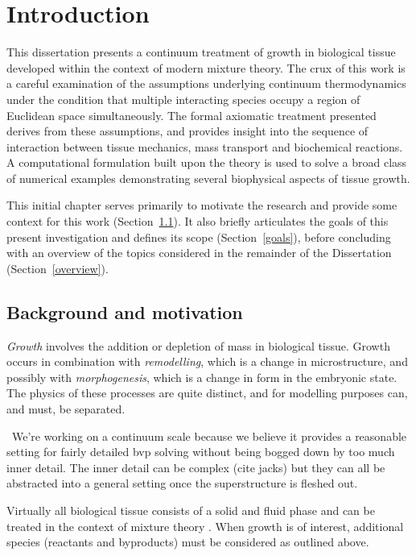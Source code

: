 \chapter{Introduction}
\label{introduction}

This dissertation presents a continuum treatment of growth in
biological tissue developed within the context of modern mixture
theory. The crux of this work is a careful examination of the
assumptions underlying continuum thermodynamics under the condition
that multiple interacting species occupy a region of Euclidean space
simultaneously. The formal axiomatic treatment presented derives from
these assumptions, and provides insight into the sequence of
interaction between tissue mechanics, mass transport and biochemical
reactions. A computational formulation built upon the theory is used
to solve a broad class of numerical examples demonstrating several
biophysical aspects of tissue growth.

This initial chapter serves primarily to motivate the research and
provide some context for this work (Section~\ref{background}). It also
briefly articulates the goals of this present investigation and
defines its scope (Section~\ref{goals}), before concluding with an
overview of the topics considered in the remainder of the Dissertation
(Section~\ref{overview}).

\citep{Narayananetal:07}

\section{Background and motivation}
\label{background}

\emph{Growth} involves the addition or depletion of mass in biological
tissue. Growth occurs in combination with
\emph{remodelling}, which is a change in microstructure, and possibly
with \emph{morphogenesis}, which is a change in form in the embryonic
state. The physics of these processes are quite distinct, and for
modelling purposes can, and must, be separated.

\textbullet\ We're working on a continuum scale because we believe it provides a
reasonable setting for fairly detailed bvp solving without being
bogged down by too much inner detail. The inner detail can be complex
(cite jacks) but they can all be abstracted into a general setting
once the superstructure is fleshed out.

Virtually all biological tissue consists of a solid and fluid
phase and can be treated in the context of mixture theory
\citep{TruesdellToupin:60,TruesdellNoll:65,BedfordDrumheller:1983}.
When growth is of interest, additional species (reactants and
byproducts) must be considered as outlined above.

